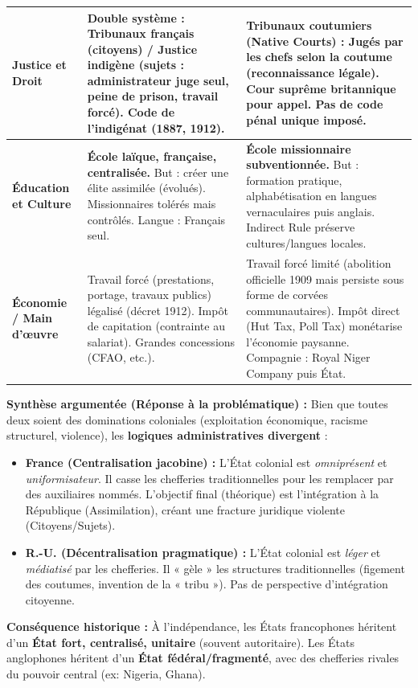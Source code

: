 \documentclass[11pt]{article}
\newcommand{\cle}[1]{{\popxbold\color{popdark}#1}}
\begin{document}
\begin{exoresolu}
\begin{center}
\begin{tabularx}{\linewidth}{|l|X|X|}
\hline
\textbf{Justice et Droit} & Double système : Tribunaux français (citoyens) / \cle{Justice indigène} (sujets : administrateur juge seul, peine de prison, travail forcé). Code de l'indigénat (1887, 1912). & \cle{Tribunaux coutumiers (Native Courts)} : Jugés par les chefs selon la coutume (reconnaissance légale). Cour suprême britannique pour appel. Pas de code pénal unique imposé. \\
\hline
\textbf{Éducation et Culture} & \textbf{École laïque, française, centralisée.} But : créer une élite assimilée (évolués). Missionnaires tolérés mais contrôlés. Langue : Français seul. & \textbf{École missionnaire subventionnée.} But : formation pratique, alphabétisation en langues vernaculaires puis anglais. \cle{Indirect Rule} préserve cultures/langues locales. \\
\hline
\textbf{Économie / Main d'œuvre} & \cle{Travail forcé} (prestations, portage, travaux publics) légalisé (décret 1912). Impôt de capitation (contrainte au salariat). Grandes concessions (CFAO, etc.). & \cle{Travail forcé} limité (abolition officielle 1909 mais persiste sous forme de corvées communautaires). Impôt direct (\cle{Hut Tax}, \cle{Poll Tax}) monétarise l'économie paysanne. Compagnie : \cle{Royal Niger Company} puis État. \\
\hline
\end{tabularx}
\end{center}

\textbf{Synthèse argumentée (Réponse à la problématique) :}
Bien que toutes deux soient des \cle{dominations coloniales} (exploitation économique, racisme structurel, violence), les \textbf{logiques administratives divergent} :
\begin{itemize}
    \item \textbf{France (Centralisation jacobine) :} L'État colonial est \emph{omniprésent} et \emph{uniformisateur}. Il casse les chefferies traditionnelles pour les remplacer par des auxiliaires nommés. L'objectif final (théorique) est l'intégration à la République (Assimilation), créant une fracture juridique violente (Citoyens/Sujets).
    \item \textbf{R.-U. (Décentralisation pragmatique) :} L'État colonial est \emph{léger} et \emph{médiatisé} par les chefferies. Il « gèle » les structures traditionnelles (figement des coutumes, invention de la « tribu »). Pas de perspective d'intégration citoyenne.
\end{itemize}
\textbf{Conséquence historique :} À l'indépendance, les États francophones héritent d'un \textbf{État fort, centralisé, unitaire} (souvent autoritaire). Les États anglophones héritent d'un \textbf{État fédéral/fragmenté}, avec des chefferies rivales du pouvoir central (ex: Nigeria, Ghana).
\end{exoresolu}
\end{document}
